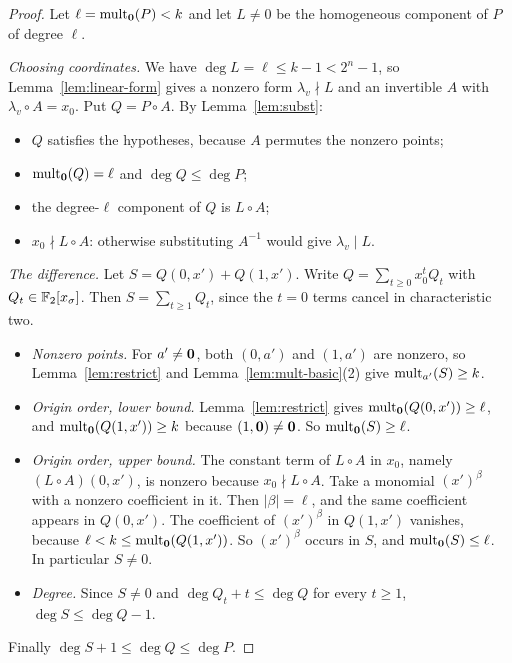\begin{proof}
Let \(\ell=\operatorname{mult}_{\mathbf 0}(P)<k\) and let \(L\ne0\) be the homogeneous component of
\(P\) of degree \(\ell\).

\emph{Choosing coordinates.} We have \(\deg L=\ell\le k-1<2^n-1\), so
Lemma~\ref{lem:linear-form} gives a nonzero form \(\lambda_v\nmid L\) and an
invertible \(A\) with \(\lambda_v\circ A=x_0\). Put \(Q=P\circ A\). By
Lemma~\ref{lem:subst}:
\begin{itemize}
 \item \(Q\) satisfies the hypotheses, because \(A\) permutes the nonzero points;
 \item \(\operatorname{mult}_{\mathbf 0}(Q)=\ell\) and \(\deg Q\le\deg P\);
 \item the degree-\(\ell\) component of \(Q\) is \(L\circ A\);
 \item \(x_0\nmid L\circ A\): otherwise substituting \(A^{-1}\) would give
 \(\lambda_v\mid L\).
\end{itemize}

\emph{The difference.} Let \(S=Q(0,x')+Q(1,x')\). Write \(Q=\sum_{t\ge0}x_0^tQ_t\)
with \(Q_t\in\mathbb F_2[x_\sigma]\). Then \(S=\sum_{t\ge1}Q_t\), since the \(t=0\) terms
cancel in characteristic two.
\begin{itemize}
 \item \emph{Nonzero points.} For \(a'\ne\mathbf 0\), both \((0,a')\) and \((1,a')\) are
 nonzero, so Lemma~\ref{lem:restrict} and Lemma~\ref{lem:mult-basic}(2) give
 \(\operatorname{mult}_{a'}(S)\ge k\).
 \item \emph{Origin order, lower bound.} Lemma~\ref{lem:restrict} gives
 \(\operatorname{mult}_{\mathbf 0}(Q(0,x'))\ge\ell\), and \(\operatorname{mult}_{\mathbf 0}(Q(1,x'))\ge k\) because
 \((1,\mathbf 0)\ne\mathbf 0\). So \(\operatorname{mult}_{\mathbf 0}(S)\ge\ell\).
 \item \emph{Origin order, upper bound.} The constant term of \(L\circ A\) in
 \(x_0\), namely \((L\circ A)(0,x')\), is nonzero because \(x_0\nmid L\circ A\).
 Take a monomial \((x')^\beta\) with a nonzero coefficient in it. Then
 \(|\beta|=\ell\), and the same coefficient appears in \(Q(0,x')\). The
 coefficient of \((x')^\beta\) in \(Q(1,x')\) vanishes, because
 \(\ell<k\le\operatorname{mult}_{\mathbf 0}(Q(1,x'))\). So \((x')^\beta\) occurs in \(S\), and
 \(\operatorname{mult}_{\mathbf 0}(S)\le\ell\). In particular \(S\ne0\).
 \item \emph{Degree.} Since \(S\ne0\) and \(\deg Q_t+t\le\deg Q\) for every
 \(t\ge1\), \(\deg S\le\deg Q-1\).
\end{itemize}
Finally \(\deg S+1\le\deg Q\le\deg P\).
\end{proof}


